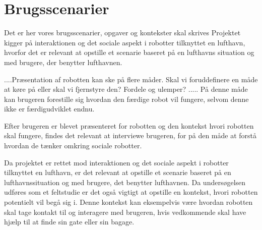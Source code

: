\section{Brugsscenarier}
\label{ParametreBrugsscenarier}
%
Det er her vores brugsscenarier, opgaver og kontekster skal skrives\blankline
%
Projektet kigger på interaktionen og det sociale aspekt i robotter tilknyttet en lufthavn, hvorfor det er relevant at opstille et scenarie baseret på en lufthavns situation og med brugere, der benytter lufthavnen.\blankline


....Præsentation af robotten kan ske på flere måder. Skal vi foruddefinere en måde at køre på eller skal vi fjernstyre den? Fordele og ulemper? ..... På denne måde kan brugeren forestille sig hvordan den færdige robot vil fungere, selvom denne ikke er færdigudviklet endnu.\blankline


Efter brugeren er blevet præsenteret for robotten og den kontekst hvori robotten skal fungere, findes det relevant at interviewe brugeren, for på den måde at forstå hvordan de tænker omkring sociale robotter.

Da projektet er rettet mod interaktionen og det sociale aspekt i robotter tilknyttet en lufthavn, er det relevant at opstille et scenarie baseret på en lufthavnssituation og med brugere, det benytter lufthavnen. Da undersøgelsen udføres som et feltstudie er det også vigtigt at opstille en kontekst, hvori robotten potentielt vil begå sig i. Denne kontekst kan eksempelvis være hvordan robotten skal tage kontakt til og interagere med brugeren, hvis vedkommende skal have hjælp til at finde sin gate eller sin bagage.\blankline
